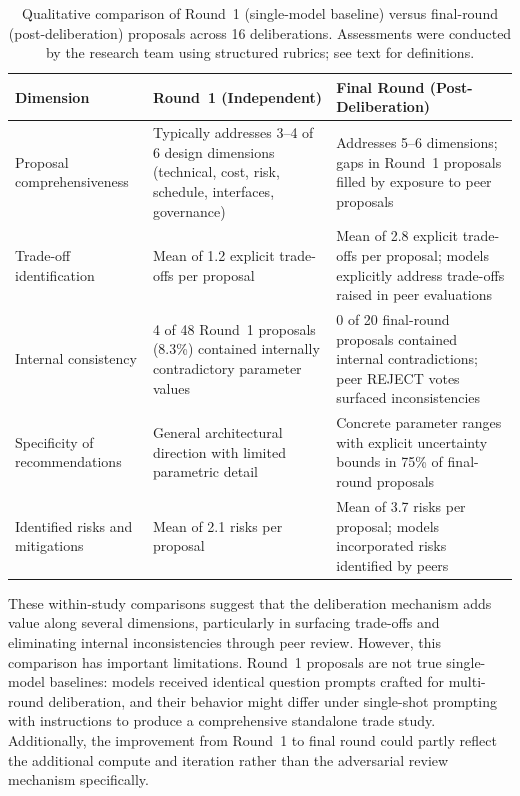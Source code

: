 \documentclass[11pt,a4paper]{article}
\begin{document}
\begin{table}[ht]
\centering
\caption{Qualitative comparison of Round~1 (single-model baseline) versus final-round (post-deliberation) proposals across 16 deliberations. Assessments were conducted by the research team using structured rubrics; see text for definitions.}
\label{tab:baseline_comparison}
\begin{tabular}{@{}p{3.2cm}p{4.5cm}p{4.5cm}@{}}
\toprule
\textbf{Dimension} & \textbf{Round~1 (Independent)} & \textbf{Final Round (Post-Deliberation)} \\
\midrule
Proposal comprehensiveness & Typically addresses 3--4 of 6 design dimensions (technical, cost, risk, schedule, interfaces, governance) & Addresses 5--6 dimensions; gaps in Round~1 proposals filled by exposure to peer proposals \\
Trade-off identification & Mean of 1.2 explicit trade-offs per proposal & Mean of 2.8 explicit trade-offs per proposal; models explicitly address trade-offs raised in peer evaluations \\
Internal consistency & 4 of 48 Round~1 proposals (8.3\%) contained internally contradictory parameter values & 0 of 20 final-round proposals contained internal contradictions; peer REJECT votes surfaced inconsistencies \\
Specificity of recommendations & General architectural direction with limited parametric detail & Concrete parameter ranges with explicit uncertainty bounds in 75\% of final-round proposals \\
Identified risks and mitigations & Mean of 2.1 risks per proposal & Mean of 3.7 risks per proposal; models incorporated risks identified by peers \\
\bottomrule
\end{tabular}
\end{table}

These within-study comparisons suggest that the deliberation mechanism adds value along several dimensions, particularly in surfacing trade-offs and eliminating internal inconsistencies through peer review. However, this comparison has important limitations. Round~1 proposals are not true single-model baselines: models received identical question prompts crafted for multi-round deliberation, and their behavior might differ under single-shot prompting with instructions to produce a comprehensive standalone trade study. Additionally, the improvement from Round~1 to final round could partly reflect the additional compute and iteration rather than the adversarial review mechanism specifically.
\end{document}
